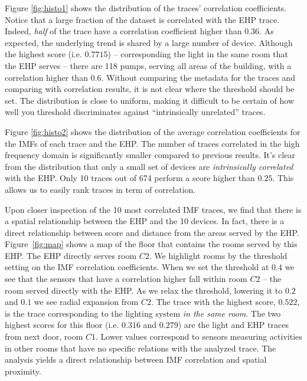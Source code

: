 Figure \ref{fig:histo1} shows the distribution of the traces' correlation coefficients.  Notice
that a large fraction of the dataset is correlated with the EHP trace.
Indeed, \emph{half} of the trace have a correlation coefficient higher than $0.36$.  As expected, the underlying
trend is shared by a large number of device.
Although the highest score (i.e. $0.7715$) -- corresponding the light in the same room that the EHP serves --
there are 118 pumps, serving all areas of the building, with a correlation higher than $0.6$.
Without comparing the metadata for the traces and comparing with correlation results, it is not clear
where the threshold should be set.  The distribution is close to uniform, making it difficult to 
be certain of how well you threshold discriminates against ``intrinsically unrelated'' traces.

Figure \ref{fig:histo2} shows the distribution of the average correlation coefficients for the IMFs of
each trace and the EHP.  The number of traces correlated in the high frequency domain is significantly smaller
compared to previous results. It's clear from the distribution that only a small set of devices are
\emph{intrinsically correlated} with the EHP.  Only 10 traces out of 674 perform a score higher than 
$0.25$. This allows us to easily rank traces in term of correlation.

Upon closer inspection of the 10 most correlated IMF traces, we find that there is a spatial relationship
between the EHP and the 10 devices.  In fact, there is a direct relationship between score and distance from
the areas served by the EHP.  Figure~\ref{fig:map} shows a map of the floor that contains the rooms served by this
EHP.  The EHP directly serves room $C2$.  We highlight rooms by the threshold setting on the IMF correlation coefficients.
When we set the threshold at $0.4$ we see that the sensors that have a correlation higher fall within room $C2$ --
the room served directly with the EHP.  As we relax the threshold, lowering it to $0.2$ and $0.1$ we see radial expansion from $C2$.  The trace with the highest score, $0.522$, is the trace corresponding to the lighting system \emph{in
the same room}.
The two highest scores for this floor (i.e. $0.316$ and $0.279$) are the light and EHP traces from next door, room $C1$.
Lower values correspond to sensors measuring activities in other rooms that have no specific relations with the analyzed trace.  The analysis yields a direct relationship between IMF correlation and spatial proximity.





